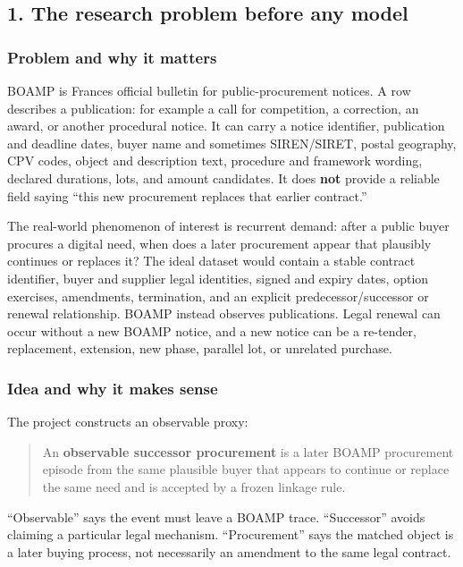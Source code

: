 \subsection{1. The research problem before any
model}\label{1-the-research-problem-before-any-model}

\subsubsection{Problem and why it
matters}\label{problem-and-why-it-matters}

BOAMP is France\textquotesingle s official bulletin for
public-procurement notices. A row describes a publication: for example a
call for competition, a correction, an award, or another procedural
notice. It can carry a notice identifier, publication and deadline
dates, buyer name and sometimes SIREN/SIRET, postal geography, CPV
codes, object and description text, procedure and framework wording,
declared durations, lots, and amount candidates. It does \textbf{not}
provide a reliable field saying ``this new procurement replaces that
earlier contract.''

The real-world phenomenon of interest is recurrent demand: after a
public buyer procures a digital need, when does a later procurement
appear that plausibly continues or replaces it? The ideal dataset would
contain a stable contract identifier, buyer and supplier legal
identities, signed and expiry dates, option exercises, amendments,
termination, and an explicit predecessor/successor or renewal
relationship. BOAMP instead observes publications. Legal renewal can
occur without a new BOAMP notice, and a new notice can be a re-tender,
replacement, extension, new phase, parallel lot, or unrelated purchase.

\subsubsection{Idea and why it makes
sense}\label{idea-and-why-it-makes-sense}

The project constructs an observable proxy:

\begin{quote}
An \textbf{observable successor procurement} is a later BOAMP
procurement episode from the same plausible buyer that appears to
continue or replace the same need and is accepted by a frozen linkage
rule.
\end{quote}

``Observable'' says the event must leave a BOAMP trace. ``Successor''
avoids claiming a particular legal mechanism. ``Procurement'' says the
matched object is a later buying process, not necessarily an amendment
to the same legal contract.

